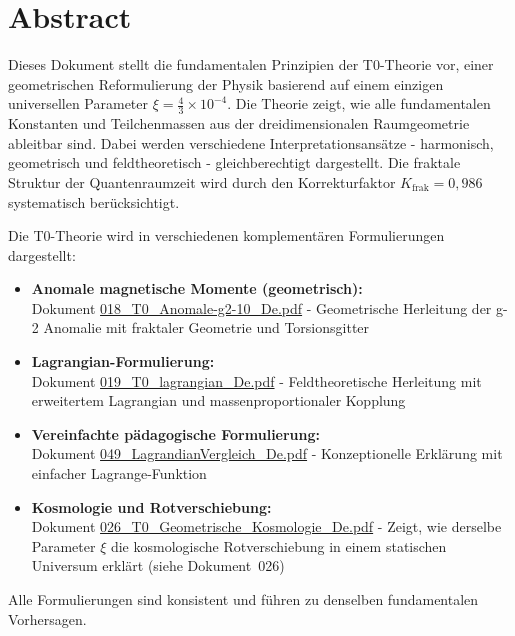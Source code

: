 \section*{Abstract}
		Dieses Dokument stellt die fundamentalen Prinzipien der T0-Theorie vor, einer geometrischen Reformulierung der Physik basierend auf einem einzigen universellen Parameter $\xi = \frac{4}{3} \times 10^{-4}$. Die Theorie zeigt, wie alle fundamentalen Konstanten und Teilchenmassen aus der dreidimensionalen Raumgeometrie ableitbar sind. Dabei werden verschiedene Interpretationsansätze - harmonisch, geometrisch und feldtheoretisch - gleichberechtigt dargestellt. Die fraktale Struktur der Quantenraumzeit wird durch den Korrekturfaktor $K_{\text{frak}} = 0{,}986$ systematisch berücksichtigt.

	
	\begin{tcolorbox}[colback=blue!10!white, colframe=blue!75!black, title=Verweise auf komplementäre T0-Formulierungen]
		Die T0-Theorie wird in verschiedenen komplementären Formulierungen dargestellt:
		
		\begin{itemize}
			\item \textbf{Anomale magnetische Momente (geometrisch):} \\
			Dokument \href{https://github.com/jpascher/T0-Time-Mass-Duality/blob/main/2/pdf/018_T0_Anomale-g2-10_De.pdf}{018\_T0\_Anomale-g2-10\_De.pdf} - 
			Geometrische Herleitung der g-2 Anomalie mit fraktaler Geometrie und Torsionsgitter
			
			\item \textbf{Lagrangian-Formulierung:} \\
			Dokument \href{https://github.com/jpascher/T0-Time-Mass-Duality/blob/main/2/pdf/019_T0_lagrangian_De.pdf}{019\_T0\_lagrangian\_De.pdf} - 
			Feldtheoretische Herleitung mit erweitertem Lagrangian und massenproportionaler Kopplung
			
			\item \textbf{Vereinfachte pädagogische Formulierung:} \\
			Dokument \href{https://github.com/jpascher/T0-Time-Mass-Duality/blob/main/2/pdf/049_LagrandianVergleich_De.pdf}{049\_LagrandianVergleich\_De.pdf} - 
			Konzeptionelle Erklärung mit einfacher Lagrange-Funktion
			
			\item \textbf{Kosmologie und Rotverschiebung:} \\
			Dokument \href{https://github.com/jpascher/T0-Time-Mass-Duality/blob/main/2/pdf/026_T0_Geometrische_Kosmologie_De.pdf}{026\_T0\_Geometrische\_Kosmologie\_De.pdf} - 
			Zeigt, wie derselbe Parameter $\xi$ die kosmologische Rotverschiebung in einem statischen Universum erklärt (siehe Dokument~026)
		\end{itemize}
		
		Alle Formulierungen sind konsistent und führen zu denselben fundamentalen Vorhersagen.
	\end{tcolorbox}
	
